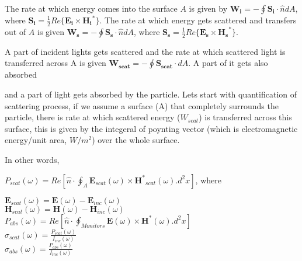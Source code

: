 \documentclass{article}
\begin{document}
The rate at which energy comes into the surface $A$ is given by $\bm{W_i}=-\oint\bm{S_i}\cdot \hat{n} dA$, where $\bm{S_i}=\frac{1}{2}Re\{\bm{E_i} \times \bm{H_i}^*\}$. The rate at which energy gets scattered and transfers out of $A$ is given $\bm{W_s}=-\oint\bm{S_s}\cdot \hat{n} dA$, where $\bm{S_s}=\frac{1}{2}Re\{\bm{E_s} \times \bm{H_s}^*\}$.

A part of incident lights gets scattered and the rate at which scattered light is transferred across A is given $\mathbf{W_{scat}}=-\oint\bm{S_{scat}}\cdot dA$. A part of it gets also absorbed 

 and a part of light gets absorbed by the particle. 
Lets start with quantification of scattering process, if we assume a surface (A) that completely surrounds the particle, there is rate at which scattered energy ($W_{scat}$) is transferred across this surface, this is given by the integeral of poynting vector (which is electromagnetic energy/unit area, $W/m^2$) over the whole surface. 

In other words, 

$P_{scat}(\omega)=Re\left [\hat{n}\cdot  \oint_{A}\bm{E}_{scat}(\omega)\times \bm{H^*}_{scat}(\omega).d^2x\right ]$, where

   

$\bm{E}_{scat}(\omega)=\bm{E}(\omega)-\bm{E}_{inc}(\omega)$\\
$\bm{H}_{scat}(\omega)=\bm{H}(\omega)-\bm{H}_{inc}(\omega)$\\


$P_{abs}(\omega)=Re\left [\hat{n}\cdot  \oint_{Monitors}\mathbf{E}(\omega)\times \mathbf{H^*}(\omega).d^2x\right ]$\\

$\sigma_{scat}(\omega)=\frac{P_{scat}(\omega)}{I_{inc}(\omega)}$\\

$\sigma_{abs}(\omega)=\frac{P_{abs}(\omega)}{I_{inc}(\omega)}$\\
\end{document}
